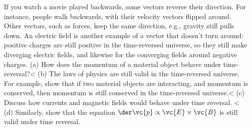 If you watch a movie played backwards, some vectors reverse their direction.
        For instance, people walk backwards, with their velocity vectors flipped around.
        Other vectors, such as forces, keep the same direction, e.g., gravity
        still pulls down. An electric field is another example of a vector that doesn't
        turn around: positive charges are still positive in the time-reversed
        universe, so they still make diverging electric fields, and likewise for
        the converging fields around negative charges. \hwendpart
        (a) How does the momentum of a material object behave under 
                time-reversal?<%
        (b) The laws of physics are still valid in the time-reversed universe.
                For example, show that if two material objects are interacting, and
                momentum is conserved, then momentum is still conserved
                in the time-reversed universe.<%
        (c) Discuss how currents and magnetic fields would behave under time reversal.
                <%
        (d) Similarly, show that the equation $\der\vc{p}\propto\vc{E}\times\vc{B}$ is still
                valid under time reversal.
